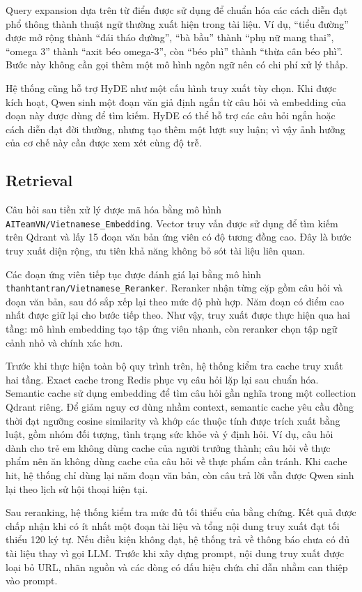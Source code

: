 \documentclass[a4paper,13pt,oneside]{report}
\begin{document}
Query expansion dựa trên từ điển được sử dụng để chuẩn hóa các cách diễn đạt phổ thông thành thuật ngữ thường xuất hiện trong tài liệu. Ví dụ, ``tiểu đường'' được mở rộng thành ``đái tháo đường'', ``bà bầu'' thành ``phụ nữ mang thai'', ``omega 3'' thành ``axit béo omega-3'', còn ``béo phì'' thành ``thừa cân béo phì''. Bước này không cần gọi thêm một mô hình ngôn ngữ nên có chi phí xử lý thấp.

Hệ thống cũng hỗ trợ HyDE như một cấu hình truy xuất tùy chọn. Khi được kích hoạt, Qwen sinh một đoạn văn giả định ngắn từ câu hỏi và embedding của đoạn này được dùng để tìm kiếm. HyDE có thể hỗ trợ các câu hỏi ngắn hoặc cách diễn đạt đời thường, nhưng tạo thêm một lượt suy luận; vì vậy ảnh hưởng của cơ chế này cần được xem xét cùng độ trễ.

\subsection{Retrieval}

Câu hỏi sau tiền xử lý được mã hóa bằng mô hình \texttt{AITeamVN/Vietnamese\_Embedding}. Vector truy vấn được sử dụng để tìm kiếm trên Qdrant và lấy 15 đoạn văn bản ứng viên có độ tương đồng cao. Đây là bước truy xuất diện rộng, ưu tiên khả năng không bỏ sót tài liệu liên quan.

Các đoạn ứng viên tiếp tục được đánh giá lại bằng mô hình \texttt{thanhtantran/Vietnamese\_Reranker}. Reranker nhận từng cặp gồm câu hỏi và đoạn văn bản, sau đó sắp xếp lại theo mức độ phù hợp. Năm đoạn có điểm cao nhất được giữ lại cho bước tiếp theo. Như vậy, truy xuất được thực hiện qua hai tầng: mô hình embedding tạo tập ứng viên nhanh, còn reranker chọn tập ngữ cảnh nhỏ và chính xác hơn.

Trước khi thực hiện toàn bộ quy trình trên, hệ thống kiểm tra cache truy xuất hai tầng. Exact cache trong Redis phục vụ câu hỏi lặp lại sau chuẩn hóa. Semantic cache sử dụng embedding để tìm câu hỏi gần nghĩa trong một collection Qdrant riêng. Để giảm nguy cơ dùng nhầm context, semantic cache yêu cầu đồng thời đạt ngưỡng cosine similarity và khớp các thuộc tính được trích xuất bằng luật, gồm nhóm đối tượng, tình trạng sức khỏe và ý định hỏi. Ví dụ, câu hỏi dành cho trẻ em không dùng cache của người trưởng thành; câu hỏi về thực phẩm nên ăn không dùng cache của câu hỏi về thực phẩm cần tránh. Khi cache hit, hệ thống chỉ dùng lại năm đoạn văn bản, còn câu trả lời vẫn được Qwen sinh lại theo lịch sử hội thoại hiện tại.

Sau reranking, hệ thống kiểm tra mức đủ tối thiểu của bằng chứng. Kết quả được chấp nhận khi có ít nhất một đoạn tài liệu và tổng nội dung truy xuất đạt tối thiểu 120 ký tự. Nếu điều kiện không đạt, hệ thống trả về thông báo chưa có đủ tài liệu thay vì gọi LLM. Trước khi xây dựng prompt, nội dung truy xuất được loại bỏ URL, nhãn nguồn và các dòng có dấu hiệu chứa chỉ dẫn nhằm can thiệp vào prompt.
\end{document}
